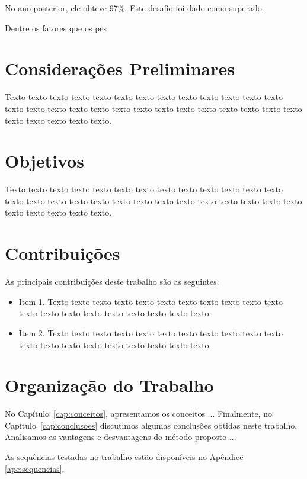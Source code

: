 No ano posterior, ele obteve 97\%. Este desafio foi dado como superado. 


Dentre os fatores que os pes



\section{Considerações Preliminares}
\label{sec:consideracoes_preliminares}


 Texto texto texto texto texto texto texto texto texto texto texto texto texto
texto texto texto texto texto texto texto texto texto texto texto texto texto
texto texto texto texto texto texto.

\section{Objetivos}
\label{sec:objetivo}

Texto texto texto texto texto texto texto texto texto texto texto texto texto
texto texto texto texto texto texto texto texto texto texto texto texto texto
texto texto texto texto texto texto.

\section{Contribuições}
\label{sec:contribucoes}

As principais contribuições deste trabalho são as seguintes:

\begin{itemize}
  \item Item 1. Texto texto texto texto texto texto texto texto texto texto
  texto texto texto texto texto texto texto texto texto texto.

  \item Item 2. Texto texto texto texto texto texto texto texto texto texto
  texto texto texto texto texto texto texto texto texto texto.

\end{itemize}

\section{Organização do Trabalho}
\label{sec:organizacao_trabalho}

No Capítulo~\ref{cap:conceitos}, apresentamos os conceitos ... Finalmente, no
Capítulo~\ref{cap:conclusoes} discutimos algumas conclusões obtidas neste
trabalho. Analisamos as vantagens e desvantagens do método proposto ... 

As sequências testadas no trabalho estão disponíveis no Apêndice \ref{ape:sequencias}.
